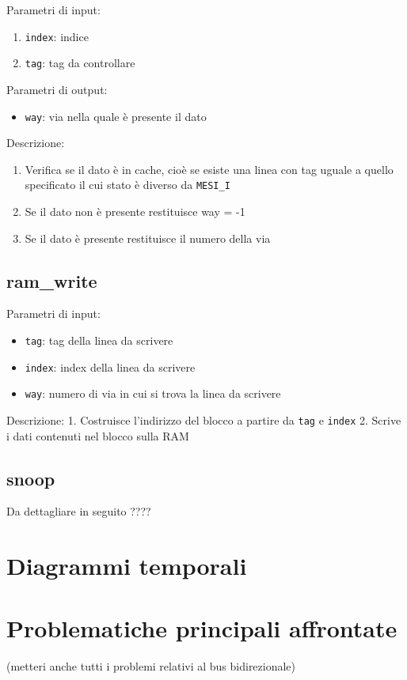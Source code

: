 Parametri di input:
\begin{enumerate}
  \item \texttt{index}: indice
  \item \texttt{tag}: tag da controllare
\end{enumerate}	

Parametri di output:
\begin{itemize}
  \item \texttt{way}: via nella quale \`e presente il dato
\end{itemize}

Descrizione:	
\begin{enumerate}
  \item Verifica se il dato \`e in cache, cio\`e se esiste una linea con tag uguale a quello specificato il cui stato \`e diverso da \texttt{MESI\_I}
  \item Se il dato non \`e presente restituisce way = -1
  \item Se il dato \`e presente restituisce il numero della via
\end{enumerate}
	
	
	
\subsection{ram\_write} %

Parametri di input:
\begin{itemize}
  \item \texttt{tag}: tag della linea da scrivere
  \item \texttt{index}: index della linea da scrivere
  \item \texttt{way}: numero di via in cui si trova la linea da scrivere
\end{itemize}

Descrizione:
	1. Costruisce l'indirizzo del blocco a partire da \texttt{tag} e \texttt{index}
	2. Scrive i dati contenuti nel blocco sulla RAM
	

\subsection{snoop}
	Da dettagliare in seguito ????
	

\section{Diagrammi temporali}

\section{Problematiche principali affrontate}

(metteri anche tutti i problemi relativi al bus bidirezionale)\\

